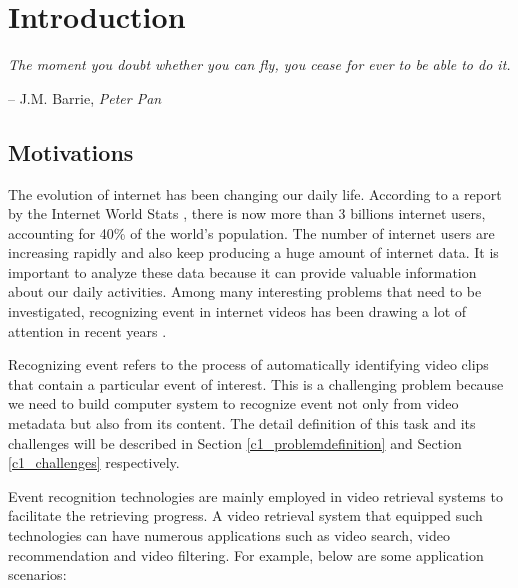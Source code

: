 \chapter{Introduction}
\label{chapter1}

\epigraph{\textit{The moment you doubt whether you can fly, you cease for ever to be able to do it.}}{ -- J.M. Barrie, \textit{Peter Pan}}


\ifpdf
    \graphicspath{{Chapter1/Figs/Raster/}{Chapter1/Figs/PDF/}{Chapter1/Figs/}}
\else
    \graphicspath{{Chapter1/Figs/Vector/}{Chapter1/Figs/}}
\fi

\section{Motivations}
The evolution of internet has been changing our daily life. According to a report by the Internet World Stats \cite{Internet1}, there is now more than 3 billions internet users, accounting for 40\% of the world's population. The number of internet users are increasing rapidly and also keep producing a huge amount of internet data. It is important to analyze these data because it can provide valuable information about our daily activities. Among many interesting problems that need to be investigated, recognizing event in internet videos has been drawing a lot of attention in recent years \cite{natarajan2012multimodal,sun2013large,habibian2013recommendations,myers2014evaluating}. 

Recognizing event refers to the process of automatically identifying video clips that contain a particular event of interest. This is a challenging problem because we need to build computer system to recognize event not only from video metadata but also from its content. The detail definition of this task and its challenges will be described in Section \ref{c1_problemdefinition} and Section \ref{c1_challenges} respectively. 

Event recognition technologies are mainly employed in  video retrieval systems to facilitate the retrieving progress. A video retrieval system that equipped such technologies can have numerous applications such as video search, video recommendation and video filtering. For example, below are some application scenarios:

